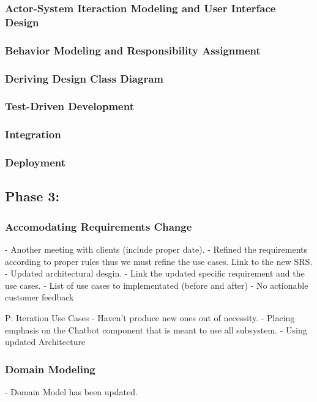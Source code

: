 \documentclass[11pt]{article}
\begin{document}
\subsubsection{Actor-System Iteraction Modeling and User Interface Design}
  
\subsubsection{Behavior Modeling and Responsibility Assignment}
  
\subsubsection{Deriving Design Class Diagram}
  
\subsubsection{Test-Driven Development}
  
\subsubsection{Integration}
  
\subsubsection{Deployment}

\subsection{Phase 3:}

\subsubsection{Accomodating Requirements Change}
- Another meeting with clients (include proper date).
- Refined the requirements according to proper rules thus we must refine the use cases. Link to the new SRS.
- Updated architectural desgin.
- Link the updated specific requirement and the use cases.
- List of use cases to implementated (before and after)
- No actionable customer feedback

P: Iteration Use Cases
- Haven't produce new ones out of necessity.
- Placing emphasis on the Chatbot component that is meant to use all subsystem.
- Using updated Architecture

\subsubsection{Domain Modeling}
- Domain Model has been updated.
\end{document}
